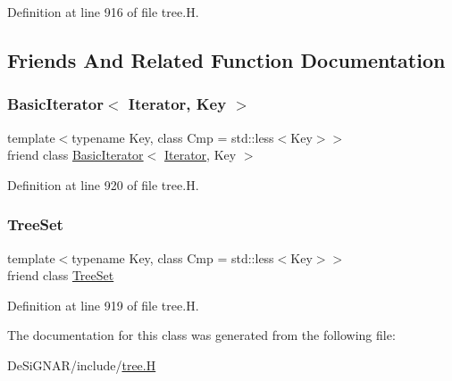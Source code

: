 Definition at line 916 of file tree.\+H.



\subsection{Friends And Related Function Documentation}
\mbox{\label{class_designar_1_1_tree_set_1_1_iterator_a0b375a570add16b09037ce1773f0ddbb}} 
\subsubsection{\texorpdfstring{Basic\+Iterator$<$ Iterator, Key $>$}{BasicIterator< Iterator, Key >}}
{\footnotesize\ttfamily template$<$typename Key, class Cmp = std\+::less$<$\+Key$>$$>$ \\
friend class \hyperlink{class_designar_1_1_basic_iterator}{Basic\+Iterator}$<$ \hyperlink{class_designar_1_1_tree_set_1_1_iterator}{Iterator}, Key $>$\hspace{0.3cm}{\ttfamily [friend]}}



Definition at line 920 of file tree.\+H.

\mbox{\label{class_designar_1_1_tree_set_1_1_iterator_a7caa42294700d2a60905ec3458a7cd8a}} 
\subsubsection{\texorpdfstring{Tree\+Set}{TreeSet}}
{\footnotesize\ttfamily template$<$typename Key, class Cmp = std\+::less$<$\+Key$>$$>$ \\
friend class \hyperlink{class_designar_1_1_tree_set}{Tree\+Set}\hspace{0.3cm}{\ttfamily [friend]}}



Definition at line 919 of file tree.\+H.



The documentation for this class was generated from the following file\+:\begin{DoxyCompactItemize}
\item 
De\+Si\+G\+N\+A\+R/include/\hyperlink{tree_8_h}{tree.\+H}\end{DoxyCompactItemize}
